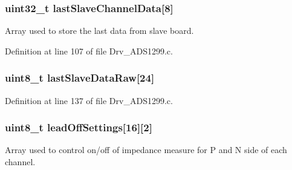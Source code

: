 \subsubsection[{\texorpdfstring{last\+Slave\+Channel\+Data}{lastSlaveChannelData}}]{\setlength{\rightskip}{0pt plus 5cm}uint32\+\_\+t last\+Slave\+Channel\+Data\mbox{[}8\mbox{]}}\hypertarget{group__ADS1299__Library_gaf412b1daf072ddca4def438f97d2c65c}{}\label{group__ADS1299__Library_gaf412b1daf072ddca4def438f97d2c65c}


Array used to store the last data from slave board. 



Definition at line 107 of file Drv\+\_\+\+A\+D\+S1299.\+c.

\subsubsection[{\texorpdfstring{last\+Slave\+Data\+Raw}{lastSlaveDataRaw}}]{\setlength{\rightskip}{0pt plus 5cm}uint8\+\_\+t last\+Slave\+Data\+Raw\mbox{[}24\mbox{]}}\hypertarget{group__ADS1299__Library_ga72ed7b344555cffff8c860e89e44afd6}{}\label{group__ADS1299__Library_ga72ed7b344555cffff8c860e89e44afd6}


Definition at line 137 of file Drv\+\_\+\+A\+D\+S1299.\+c.

\subsubsection[{\texorpdfstring{lead\+Off\+Settings}{leadOffSettings}}]{\setlength{\rightskip}{0pt plus 5cm}uint8\+\_\+t lead\+Off\+Settings\mbox{[}16\mbox{]}\mbox{[}2\mbox{]}}\hypertarget{group__ADS1299__Library_ga51cd0f121d75eaf14e9e4847f125dd8a}{}\label{group__ADS1299__Library_ga51cd0f121d75eaf14e9e4847f125dd8a}


Array used to control on/off of impedance measure for P and N side of each channel. 



